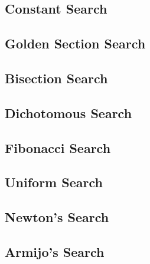 
\subsection{Constant Search}


\subsection{Golden Section Search}


\subsection{Bisection Search}


\subsection{Dichotomous Search}


\subsection{Fibonacci Search}


\subsection{Uniform Search}


\subsection{Newton's Search}


\subsection{Armijo's Search}

